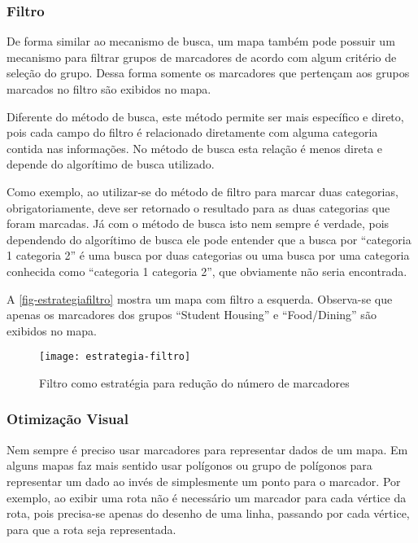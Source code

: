 	
	\subsubsection{Filtro}
	De forma similar ao mecanismo de busca, um mapa também pode possuir um mecanismo para filtrar grupos de marcadores de acordo com algum critério de seleção do grupo. Dessa forma somente os marcadores que pertençam aos grupos marcados no filtro são exibidos no mapa. 
	
	Diferente do método de busca, este método permite ser mais específico e direto, pois cada campo do filtro é relacionado diretamente com alguma categoria contida nas informações. No método de busca esta relação é menos direta e depende do algorítimo de busca utilizado.  
	
	Como exemplo, ao utilizar-se do método de filtro para marcar duas categorias, obrigatoriamente, deve ser retornado o resultado para as duas categorias que foram marcadas. Já com o método de busca isto nem sempre é verdade, pois dependendo do algorítimo de busca ele pode entender que a busca por ``categoria 1 categoria 2'' é uma busca por duas categorias ou uma busca por uma categoria conhecida como ``categoria 1 categoria 2'', que obviamente não seria encontrada. 
		
	A \autoref{fig-estrategiafiltro} mostra um mapa com filtro a esquerda. Observa-se que apenas os marcadores dos grupos  ``Student Housing'' e ``Food/Dining''  são exibidos no mapa.
	 \begin{figure}[htb]
	\caption{\label{fig-estrategiafiltro}Filtro como estratégia para redução do número de marcadores}
	\begin{center}
	    \texttt{[image: estrategia-filtro]}
	\end{center}
	\end{figure}
	 
	\subsubsection{Otimização Visual}
	Nem sempre é preciso usar marcadores para representar dados de um mapa. Em alguns mapas faz mais sentido usar polígonos ou grupo de polígonos para representar um dado ao invés de simplesmente um ponto para o marcador. Por exemplo, ao exibir uma rota  não é necessário um marcador para cada vértice da rota, pois precisa-se apenas do desenho de uma linha, passando por cada vértice, para que a rota seja representada.
	

